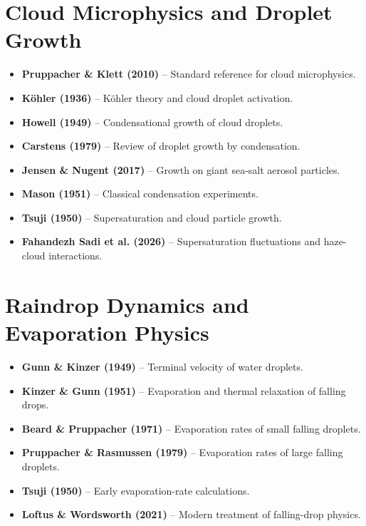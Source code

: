 \documentclass[11pt,a4paper]{article}
\begin{document}
\section{Cloud Microphysics and Droplet Growth}
\begin{itemize}
    \item \textbf{Pruppacher \& Klett (2010)} -- Standard reference for cloud microphysics.
    \item \textbf{Köhler (1936)} -- Köhler theory and cloud droplet activation.
    \item \textbf{Howell (1949)} -- Condensational growth of cloud droplets.
    \item \textbf{Carstens (1979)} -- Review of droplet growth by condensation.
    \item \textbf{Jensen \& Nugent (2017)} -- Growth on giant sea-salt aerosol particles.
    \item \textbf{Mason (1951)} -- Classical condensation experiments.
    \item \textbf{Tsuji (1950)} -- Supersaturation and cloud particle growth.
    \item \textbf{Fahandezh Sadi et al. (2026)} -- Supersaturation fluctuations and haze-cloud interactions.
\end{itemize}
\section{Raindrop Dynamics and Evaporation Physics}
\begin{itemize}
    \item \textbf{Gunn \& Kinzer (1949)} -- Terminal velocity of water droplets.
    \item \textbf{Kinzer \& Gunn (1951)} -- Evaporation and thermal relaxation of falling drops.
    \item \textbf{Beard \& Pruppacher (1971)} -- Evaporation rates of small falling droplets.
    \item \textbf{Pruppacher \& Rasmussen (1979)} -- Evaporation rates of large falling droplets.
    \item \textbf{Tsuji (1950)} -- Early evaporation-rate calculations.
    \item \textbf{Loftus \& Wordsworth (2021)} -- Modern treatment of falling-drop physics.
\end{itemize}
\end{document}

